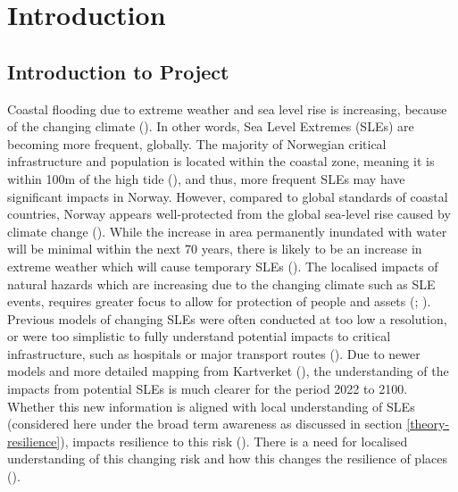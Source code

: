 
\chapter{Introduction}
\section{Introduction to Project}
Coastal flooding due to extreme weather and sea level rise is increasing, because of the changing climate (\cite{ipcc_sea_2021}).  In other words, Sea Level Extremes (SLEs) are becoming more frequent, globally. The majority of Norwegian critical infrastructure and population is located within the coastal zone, meaning it is within 100m of the high tide (\cite{engebakken_construction_2022}), and thus, more frequent SLEs may have significant impacts in Norway. However, compared to global standards of coastal countries, Norway appears well-protected from the global sea-level rise caused by climate change (\cite{aunan_strong_2008}). While the increase in area permanently inundated with water will be minimal within the next 70 years, there is likely to be an increase in extreme weather which will cause temporary SLEs (\cite{aunan_strong_2008}). The localised impacts of natural hazards which are increasing due to the changing climate such as SLE events, requires greater focus to allow for protection of people and assets (\cite{lujala_quantifying_2014}; \cite{aunan_strong_2008}). Previous models of changing SLEs were often conducted at too low a resolution, or were too simplistic to fully understand potential impacts to critical infrastructure, such as hospitals or major transport routes (\cite{hoffken_effects_2020}). Due to newer models and more detailed mapping from Kartverket (\cite{kartverket_se_2021}), the understanding of the impacts from potential SLEs is much clearer for the period 2022 to 2100. Whether this new information is aligned with local understanding of SLEs (considered here under the broad term awareness as discussed in section \ref{theory-resilience}), impacts resilience to this risk (\cite{setten_we_2019}).  There is a need for localised understanding of this changing risk and how this changes the resilience of places (\cite{rod_integrated_2012}).
\paragraph{}

